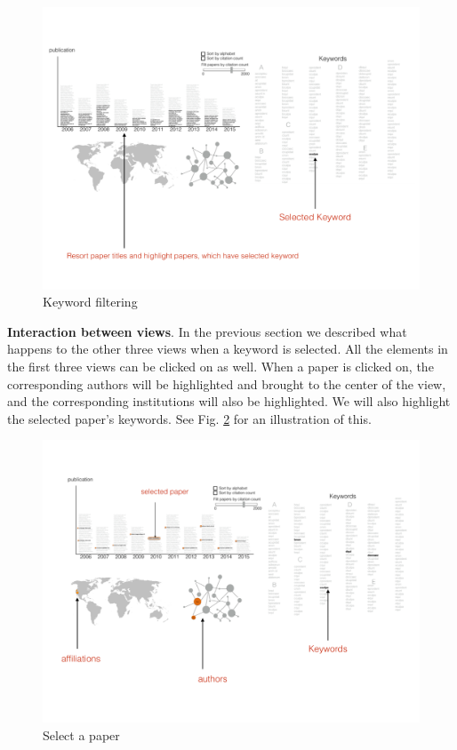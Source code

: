 \documentclass[12pt]{article}
\begin{document}
\begin{figure}[htb!]
    \centering
    \includegraphics[width=160mm]{visproposalDrawing_page_Part_4.pdf}
    \caption{Keyword filtering}
    \label{fig:click_keyword}
\end{figure}

\textbf{Interaction between views}. In the previous section we described what happens to the other three views when a keyword is selected. All the elements in the first three views can be clicked on as well. When a paper is clicked on, the corresponding authors will be highlighted and brought to the center of the view, and the corresponding institutions will also be highlighted. We will also highlight the selected paper's keywords. See Fig. \ref*{fig:select_paper} for an illustration of this.

\begin{figure}[htb!]
    \centering
    \includegraphics[width=160mm]{visproposalDrawing_page_Part_3.pdf}
    \caption{Select a paper}
    \label{fig:select_paper}
\end{figure}
\end{document}
